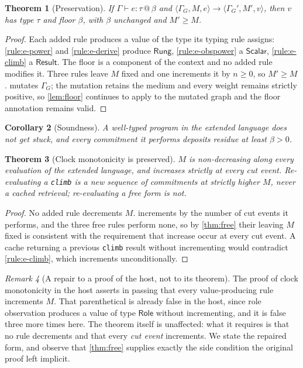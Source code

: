 \documentclass[11pt,twocolumn,a4paper]{article}
\theoremstyle{plain}
\newtheorem{theorem}{Theorem}[section]
\newtheorem{corollary}[theorem]{Corollary}
\theoremstyle{definition}
\theoremstyle{remark}
\newtheorem{remark}[theorem]{Remark}
\newcommand{\Gph}{\Gamma}
\newcommand{\flo}{\beta}
\newcommand{\shk}[1]{\texttt{#1}}
\begin{document}
\begin{theorem}[Preservation]
\label{thm:preservation}
If $\Gph\vdash e:\tau\,@\,\flo$ and $\langle\Gph_G,M,e\rangle\to
\langle\Gph_G',M',v\rangle$, then $v$ has type $\tau$ and floor $\flo$, with
$\flo$ unchanged and $M'\ge M$.
\end{theorem}

\begin{proof}
Each added rule produces a value of the type its typing rule assigns:
\cref{rule:e-power} and \cref{rule:e-derive} produce $\mathsf{Rung}$,
\cref{rule:e-obspower} a $\mathsf{Scalar}$, \cref{rule:e-climb} a
$\mathsf{Result}$. The floor is a component of the context and no added rule
modifies it. Three rules leave $M$ fixed and one increments it by $n\ge0$, so
$M'\ge M$.  mutates $\Gph_G$; the mutation retains the
medium and every weight remains strictly positive, so \cref{lem:floor}
continues to apply to the mutated graph and the floor annotation remains valid.
\end{proof}

\begin{corollary}[Soundness]
\label{cor:soundness}
A well-typed program in the extended language does not get stuck, and every
commitment it performs deposits residue at least $\flo>0$.
\end{corollary}

\begin{theorem}[Clock monotonicity is preserved]
\label{thm:monotone}
$M$ is non-decreasing along every evaluation of the extended language, and
increases strictly at every cut event. Re-evaluating a \shk{climb} is a new
sequence of commitments at strictly higher $M$, never a cached retrieval;
re-evaluating a free form is not.
\end{theorem}

\begin{proof}
No added rule decrements $M$.  increments by the number of
cut events it performs, and the three free rules perform none, so by
\cref{thm:free} their leaving $M$ fixed is consistent with the requirement that
increase occur at every cut event. A cache returning a previous \shk{climb}
result without incrementing would contradict \cref{rule:e-climb}, which
increments unconditionally.
\end{proof}

\begin{remark}[A repair to a proof of the host, not to its theorem]
\label{rem:monotone-repair}
The proof of clock monotonicity in the host asserts in passing that every
value-producing rule increments $M$. That parenthetical is already false in the
host, since role observation produces a value of type $\mathsf{Role}$ without
incrementing, and it is false three more times here. The theorem itself is
unaffected: what it requires is that no rule decrements and that every
\emph{cut event} increments. We state the repaired form, and observe that
\cref{thm:free} supplies exactly the side condition the original proof left
implicit.
\end{remark}
\end{document}
